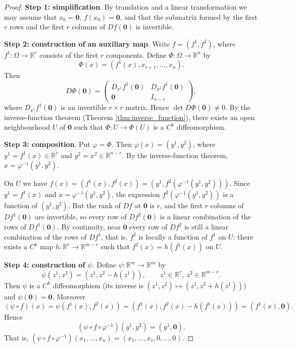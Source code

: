 \begin{proof}
\textbf{Step 1: simplification}. By translation and a linear transformation we may assume that $x_0 = \mathbf{0}$, $f(x_0) = \mathbf{0}$, and that the submatrix formed by the first $r$ rows and the first $r$ columns of $Df(\mathbf{0})$ is invertible.

\textbf{Step 2: construction of an auxiliary map}. Write $f = (f^1, f^2)$, where $f^1: \Omega \to \mathbb{R}^r$ consists of the first $r$ components. Define $\Phi: \Omega \to \mathbb{R}^n$ by
\[
\Phi(x) = (f^1(x), x_{r+1}, \dots, x_n).
\]
Then
\[
D\Phi(\mathbf{0}) = \begin{pmatrix} D_{x^1} f^1(\mathbf{0}) & D_{x^2} f^1(\mathbf{0}) \\ \mathbf{0} & I_{n-r} \end{pmatrix},
\]
where $D_{x^1} f^1(\mathbf{0})$ is an invertible $r \times r$ matrix. Hence $\det D\Phi(\mathbf{0}) \neq 0$. By the inverse-function theorem (Theorem \ref{thm:inverse_function}), there exists an open neighbourhood $U$ of $\mathbf{0}$ such that $\Phi: U \to \Phi(U)$ is a $C^k$ diffeomorphism.

\textbf{Step 3: composition}. Put $\varphi = \Phi$. Then $\varphi(x) = (y^1, y^2)$, where $y^1 = f^1(x) \in \mathbb{R}^r$ and $y^2 = x^2 \in \mathbb{R}^{n-r}$. By the inverse-function theorem, $x = \varphi^{-1}(y^1, y^2)$.

On $U$ we have $f(x) = (f^1(x), f^2(x)) = (y^1, f^2(\varphi^{-1}(y^1, y^2)))$. Since $y^1 = f^1(x)$ and $x = \varphi^{-1}(y^1, y^2)$, the expression $f^2(\varphi^{-1}(y^1, y^2))$ is a function of $(y^1, y^2)$. But the rank of $Df$ at $\mathbf{0}$ is $r$, and the first $r$ columns of $Df^1(\mathbf{0})$ are invertible, so every row of $Df^2(\mathbf{0})$ is a linear combination of the rows of $Df^1(\mathbf{0})$. By continuity, near $\mathbf{0}$ every row of $Df^2$ is still a linear combination of the rows of $Df^1$, that is, $f^2$ is locally a function of $f^1$ on $U$: there exists a $C^k$ map $h: \mathbb{R}^r \to \mathbb{R}^{m-r}$ such that $f^2(x) = h(f^1(x))$ on $U$.

\textbf{Step 4: construction of $\psi$}. Define $\psi: \mathbb{R}^m \to \mathbb{R}^m$ by
\[
\psi(z^1, z^2) = (z^1, z^2 - h(z^1)), \qquad z^1 \in \mathbb{R}^r,\ z^2 \in \mathbb{R}^{m-r}.
\]
Then $\psi$ is a $C^k$ diffeomorphism (its inverse is $(z^1, z^2) \mapsto (z^1, z^2 + h(z^1))$) and $\psi(\mathbf{0}) = \mathbf{0}$. Moreover
\[
(\psi \circ f)(x) = \psi(f^1(x), f^2(x)) = (f^1(x), f^2(x) - h(f^1(x))) = (f^1(x), \mathbf{0}).
\]
Hence
\[
(\psi \circ f \circ \varphi^{-1})(y^1, y^2) = (y^1, \mathbf{0}).
\]
That is, $(\psi \circ f \circ \varphi^{-1})(x_1, \dots, x_n) = (x_1, \dots, x_r, 0, \dots, 0)$.
\end{proof}

